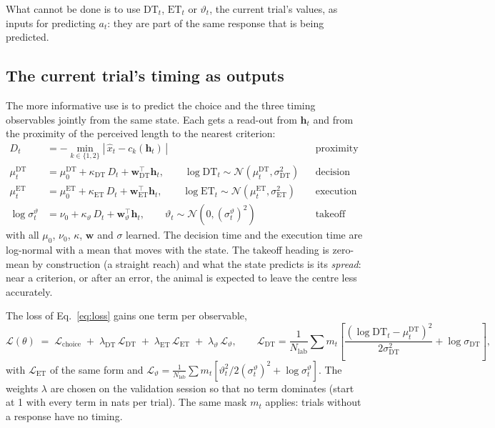 \documentclass[11pt,a4paper]{article}
\newcommand{\vect}[1]{\bm{#1}}
\newcommand{\T}{^{\top}}
\begin{document}
What cannot be done is to use $\mathrm{DT}_t$, $\mathrm{ET}_t$ or $\vartheta_t$, the
current trial's values, as inputs for predicting $a_t$: they are part of the same
response that is being predicted.

\subsection{The current trial's timing as outputs}

The more informative use is to predict the choice and the three timing observables
jointly from the same state. Each gets a read-out from $\vect{h}_t$ and from the
proximity of the perceived length to the nearest criterion:
\begin{align}
  D_t &= -\min_{k \in \{1,2\}} \left|\, \hat{x}_t - c_k(\vect{h}_t) \,\right|
    && \text{proximity to the nearest criterion} \label{eq:dt-D}\\
  \mu^{\mathrm{DT}}_t &= \mu^{\mathrm{DT}}_0 + \kappa_{\mathrm{DT}}\, D_t + \vect{w}_{\mathrm{DT}}\T \vect{h}_t,
    \qquad \log \mathrm{DT}_t \sim \mathcal{N}\!\left(\mu^{\mathrm{DT}}_t, \sigma_{\mathrm{DT}}^2\right)
    && \text{decision time} \label{eq:dt-mu}\\
  \mu^{\mathrm{ET}}_t &= \mu^{\mathrm{ET}}_0 + \kappa_{\mathrm{ET}}\, D_t + \vect{w}_{\mathrm{ET}}\T \vect{h}_t,
    \qquad \log \mathrm{ET}_t \sim \mathcal{N}\!\left(\mu^{\mathrm{ET}}_t, \sigma_{\mathrm{ET}}^2\right)
    && \text{execution time} \label{eq:et-mu}\\
  \log \sigma^{\vartheta}_t &= \nu_0 + \kappa_{\vartheta}\, D_t + \vect{w}_{\vartheta}\T \vect{h}_t,
    \qquad \vartheta_t \sim \mathcal{N}\!\left(0, (\sigma^{\vartheta}_t)^2\right)
    && \text{takeoff heading} \label{eq:th-sig}
\end{align}
with all $\mu_0$, $\nu_0$, $\kappa$, $\vect{w}$ and $\sigma$ learned. The decision time
and the execution time are log-normal with a mean that moves with the state. The takeoff
heading is zero-mean by construction (a straight reach) and what the state predicts is
its \emph{spread}: near a criterion, or after an error, the animal is expected to leave
the centre less accurately.

The loss of Eq.~\eqref{eq:loss} gains one term per observable,
\begin{equation}
  \mathcal{L}(\theta) \;=\; \mathcal{L}_{\mathrm{choice}}
  \;+\; \lambda_{\mathrm{DT}}\, \mathcal{L}_{\mathrm{DT}}
  \;+\; \lambda_{\mathrm{ET}}\, \mathcal{L}_{\mathrm{ET}}
  \;+\; \lambda_{\vartheta}\, \mathcal{L}_{\vartheta},
  \qquad
  \mathcal{L}_{\mathrm{DT}} = \frac{1}{N_{\mathrm{lab}}} \sum m_t
  \left[ \frac{(\log \mathrm{DT}_t - \mu^{\mathrm{DT}}_t)^2}{2\sigma_{\mathrm{DT}}^2}
         + \log \sigma_{\mathrm{DT}} \right],
  \label{eq:loss-joint}
\end{equation}
with $\mathcal{L}_{\mathrm{ET}}$ of the same form and
$\mathcal{L}_{\vartheta} = \frac{1}{N_{\mathrm{lab}}}\sum m_t
[\vartheta_t^2 / 2(\sigma^{\vartheta}_t)^2 + \log \sigma^{\vartheta}_t]$. The weights
$\lambda$ are chosen on the validation session so that no term dominates (start at 1
with every term in nats per trial). The same mask $m_t$ applies: trials without a
response have no timing.
\end{document}
